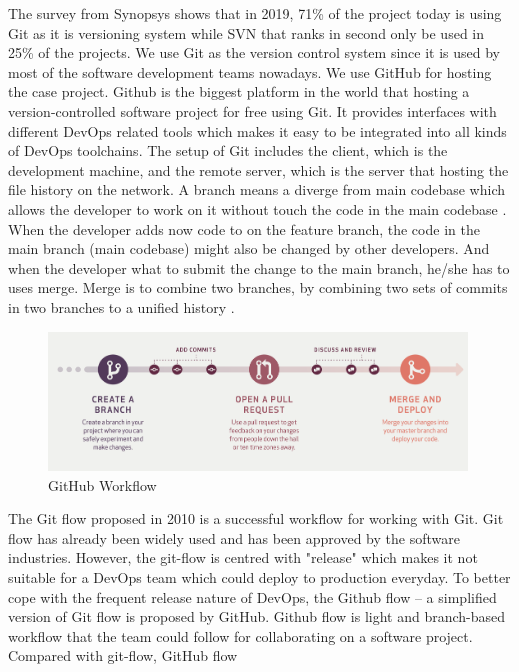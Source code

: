 The survey \cite{CompareR31:online} from Synopsys shows that in 2019, 71\% of the project today is using Git as it is versioning system while SVN that ranks in second only be used in 25\% of the projects. We use Git as the version control system since it is used by most of the software development teams nowadays. We use GitHub for hosting the case project. Github is the biggest platform in the world that hosting a version-controlled software project for free using Git. It provides interfaces with different DevOps related tools which makes it easy to be integrated into all kinds of DevOps toolchains. The setup of Git includes the client, which is the development machine, and the remote server, which is the server that hosting the file history on the network. A branch means a diverge from main codebase which allows the developer to work on it without touch the code in the main codebase \cite{GitBranc33:online}. When the developer adds now code to on the feature branch, the code in the main branch (main codebase) might also be changed by other developers. And when the developer what to submit the change to the main branch, he/she has to uses merge. Merge is to combine two branches, by combining two sets of commits in two branches to a unified history \cite{GitMerge0:online}. 
\begin{figure}[h]
\centering
\includegraphics[width=0.99\textwidth]{pics/git.png}
\caption{GitHub Workflow \cite{guides2013understanding}}
\label{fig:git}
\end{figure}
\par
The Git flow \cite{driessen2010successful} proposed in 2010 is a successful workflow for working with Git. Git flow has already been widely used and has been approved by the software industries. However, the git-flow is centred with "release" which makes it not suitable for a DevOps team which could deploy to production everyday\cite{guides2013understanding}. To better cope with the frequent release nature of DevOps, the Github flow -- a simplified version of Git flow is proposed by GitHub. Github flow is light and branch-based workflow that the team could follow for collaborating on a software project. Compared with git-flow, GitHub flow 
